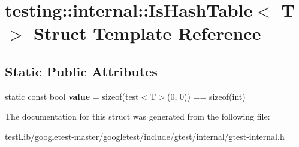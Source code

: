 \hypertarget{structtesting_1_1internal_1_1IsHashTable}{}\section{testing\+:\+:internal\+:\+:Is\+Hash\+Table$<$ T $>$ Struct Template Reference}
\label{structtesting_1_1internal_1_1IsHashTable}
\subsection*{Static Public Attributes}
\begin{DoxyCompactItemize}
\item 
\mbox{\label{structtesting_1_1internal_1_1IsHashTable_a165e0a3eddfa5fadf9b950be6432d848}} 
static const bool {\bfseries value} = sizeof(test$<$T$>$(0, 0)) == sizeof(int)
\end{DoxyCompactItemize}


The documentation for this struct was generated from the following file\+:\begin{DoxyCompactItemize}
\item 
test\+Lib/googletest-\/master/googletest/include/gtest/internal/gtest-\/internal.\+h\end{DoxyCompactItemize}
